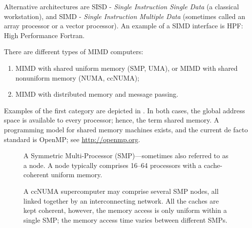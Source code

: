 Alternative architectures are SISD - \emph{Single Instruction Single Data} (a
classical workstation), and SIMD - \emph{Single Instruction Multiple Data}
(sometimes called an array processor or a vector processor). An example of a
SIMD interface is HPF: High Performance Fortran.

There are different types of MIMD computers:
\begin{enumerate}
\item MIMD with shared uniform memory (SMP, UMA), or MIMD with shared nonuniform
  memory (NUMA, ccNUMA);
\item MIMD with distributed memory and message passing.
\end{enumerate}

Examples of the first category are depicted in . In
both cases, the global address space is available to every processor; hence, the
term shared memory. A programming model for shared memory machines exists, and
the current de facto standard is OpenMP; see \url{http://openmp.org}.

\begin{figure}
  \centering
  \caption{
    A Symmetric Multi-Processor (SMP)---sometimes also referred to as a node. A
    node typically comprises 16--64 processors with a cache-coherent uniform
    memory.
  }
  \label{fig:SMP}
\end{figure}

\begin{figure}
  \centering
  
  \caption{
    A ccNUMA supercomputer may comprise several SMP nodes, all linked together
    by an interconnecting network. All the caches are kept coherent, however,
    the memory access is only uniform within a single SMP; the memory access
    time varies between different SMPs.
  }
  \label{fig:ccNUMA}
\end{figure}

